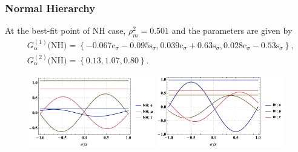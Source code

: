 \documentclass[a4paper,11pt,captions=tableheading,DIV=12]{scrartcl}
\numberwithin{equation}{section}
\newcommand\co[1]{\mathrm{c}_{#1}}
\newcommand\si[1]{\mathrm{s}_{#1}}
\begin{document}
\subsubsection{Normal Hierarchy}
At the best-fit point of NH case, $\rho_m^2=0.501$ and the parameters are given by
\begin{align}
 &G^{(1)}_\alpha\text{(NH)}=\left\{
 -0.067\co\sigma-0.095\si\sigma,
 0.039\co\sigma+0.63\si\sigma,
 0.028\co\sigma-0.53\si\sigma
\right\},\\
 &G^{(2)}_\alpha\text{(NH)}=\left\{
   0.13, 1.07, 0.80
\right\}.
\end{align}

\begin{figure}[ht]
  \centering
  \includegraphics[width=0.49\textwidth]{bfp_analysis_f_NH.pdf}
  \includegraphics[width=0.49\textwidth]{bfp_analysis_f_IH.pdf}
\end{figure}
\end{document}
